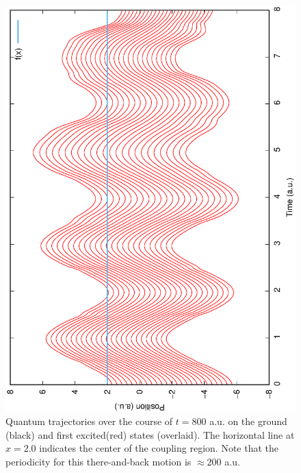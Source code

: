 \documentclass[journal=jpc]{achemso}
\begin{document}
\begin{figure}
\centering
\includegraphics[angle=-90,width=1.0\textwidth]{eps-files/gbc-800-09.eps}
\caption{Quantum trajectories over the course of $t=800$ a.u. on the ground (black) and first excited(red) states (overlaid). The horizontal line at $x=2.0$ indicates the center of the coupling region. Note that the periodicity for this there-and-back motion is $\approx200$ a.u.}
\label{fig:gbc-25}
\end{figure}
\maketitle
\end{document}
